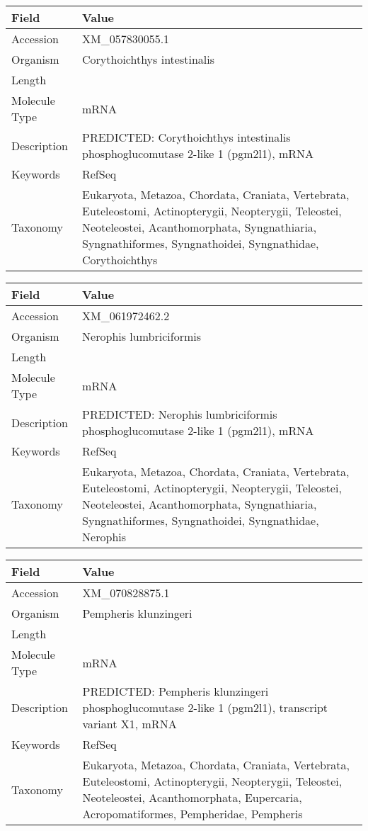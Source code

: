 \documentclass[10pt]{article}
\begin{document}
\vspace{1em}
{\footnotesize
\begin{longtable}{>{\raggedright\arraybackslash}p{4.5cm} >{\raggedright\arraybackslash}p{11.5cm}}
\textbf{Field} & \textbf{Value} \\
\hline
Accession & XM\_057830055.1 \\
Organism & Corythoichthys intestinalis \\
Length & 2215 \\
Molecule Type & mRNA \\
Description & PREDICTED: Corythoichthys intestinalis phosphoglucomutase 2-like 1 (pgm2l1), mRNA \\
Keywords & RefSeq \\
Taxonomy & Eukaryota, Metazoa, Chordata, Craniata, Vertebrata, Euteleostomi, Actinopterygii, Neopterygii, Teleostei, Neoteleostei, Acanthomorphata, Syngnathiaria, Syngnathiformes, Syngnathoidei, Syngnathidae, Corythoichthys \\
\end{longtable}
}

\vspace{1em}
{\footnotesize
\begin{longtable}{>{\raggedright\arraybackslash}p{4.5cm} >{\raggedright\arraybackslash}p{11.5cm}}
\textbf{Field} & \textbf{Value} \\
\hline
Accession & XM\_061972462.2 \\
Organism & Nerophis lumbriciformis \\
Length & 5127 \\
Molecule Type & mRNA \\
Description & PREDICTED: Nerophis lumbriciformis phosphoglucomutase 2-like 1 (pgm2l1), mRNA \\
Keywords & RefSeq \\
Taxonomy & Eukaryota, Metazoa, Chordata, Craniata, Vertebrata, Euteleostomi, Actinopterygii, Neopterygii, Teleostei, Neoteleostei, Acanthomorphata, Syngnathiaria, Syngnathiformes, Syngnathoidei, Syngnathidae, Nerophis \\
\end{longtable}
}

\vspace{1em}
{\footnotesize
\begin{longtable}{>{\raggedright\arraybackslash}p{4.5cm} >{\raggedright\arraybackslash}p{11.5cm}}
\textbf{Field} & \textbf{Value} \\
\hline
Accession & XM\_070828875.1 \\
Organism & Pempheris klunzingeri \\
Length & 2199 \\
Molecule Type & mRNA \\
Description & PREDICTED: Pempheris klunzingeri phosphoglucomutase 2-like 1 (pgm2l1), transcript variant X1, mRNA \\
Keywords & RefSeq \\
Taxonomy & Eukaryota, Metazoa, Chordata, Craniata, Vertebrata, Euteleostomi, Actinopterygii, Neopterygii, Teleostei, Neoteleostei, Acanthomorphata, Eupercaria, Acropomatiformes, Pempheridae, Pempheris \\
\end{longtable}
}
\end{document}

